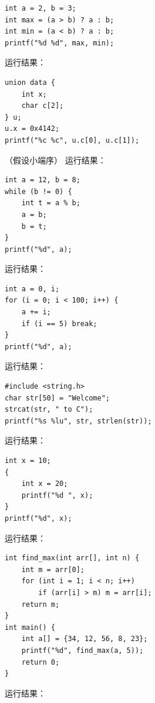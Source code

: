 \documentclass[a4paper,11pt]{article}
\begin{document}
\q
\begin{lstlisting}[language={[custom]C}]
int a = 2, b = 3;
int max = (a > b) ? a : b;
int min = (a < b) ? a : b;
printf("%d %d", max, min);
\end{lstlisting}
运行结果：\underline{\hspace{3cm}}


\q
\begin{lstlisting}[language={[custom]C}]
union data {
    int x;
    char c[2];
} u;
u.x = 0x4142;
printf("%c %c", u.c[0], u.c[1]);
\end{lstlisting}
（假设小端序）
运行结果：\underline{\hspace{3cm}}


\q
\begin{lstlisting}[language={[custom]C}]
int a = 12, b = 8;
while (b != 0) {
    int t = a % b;
    a = b;
    b = t;
}
printf("%d", a);
\end{lstlisting}
运行结果：\underline{\hspace{3cm}}


\q
\begin{lstlisting}[language={[custom]C}]
int a = 0, i;
for (i = 0; i < 100; i++) {
    a += i;
    if (i == 5) break;
}
printf("%d", a);
\end{lstlisting}
运行结果：\underline{\hspace{3cm}}


\q
\begin{lstlisting}[language={[custom]C}]
#include <string.h>
char str[50] = "Welcome";
strcat(str, " to C");
printf("%s %lu", str, strlen(str));
\end{lstlisting}
运行结果：\underline{\hspace{3cm}}


\q
\begin{lstlisting}[language={[custom]C}]
int x = 10;
{
    int x = 20;
    printf("%d ", x);
}
printf("%d", x);
\end{lstlisting}
运行结果：\underline{\hspace{3cm}}


\q
\begin{lstlisting}[language={[custom]C}]
int find_max(int arr[], int n) {
    int m = arr[0];
    for (int i = 1; i < n; i++)
        if (arr[i] > m) m = arr[i];
    return m;
}
int main() {
    int a[] = {34, 12, 56, 8, 23};
    printf("%d", find_max(a, 5));
    return 0;
}
\end{lstlisting}
运行结果：\underline{\hspace{3cm}}
\end{document}
